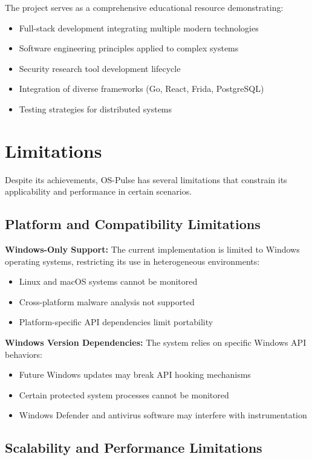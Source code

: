 The project serves as a comprehensive educational resource demonstrating:
\begin{itemize}
    \item Full-stack development integrating multiple modern technologies
    \item Software engineering principles applied to complex systems
    \item Security research tool development lifecycle
    \item Integration of diverse frameworks (Go, React, Frida, PostgreSQL)
    \item Testing strategies for distributed systems
\end{itemize}

\section{Limitations}

Despite its achievements, OS-Pulse has several limitations that constrain its applicability and performance in certain scenarios.

\subsection{Platform and Compatibility Limitations}

\textbf{Windows-Only Support:}
The current implementation is limited to Windows operating systems, restricting its use in heterogeneous environments:
\begin{itemize}
    \item Linux and macOS systems cannot be monitored
    \item Cross-platform malware analysis not supported
    \item Platform-specific API dependencies limit portability
\end{itemize}

\textbf{Windows Version Dependencies:}
The system relies on specific Windows API behaviors:
\begin{itemize}
    \item Future Windows updates may break API hooking mechanisms
    \item Certain protected system processes cannot be monitored
    \item Windows Defender and antivirus software may interfere with instrumentation
\end{itemize}

\subsection{Scalability and Performance Limitations}

